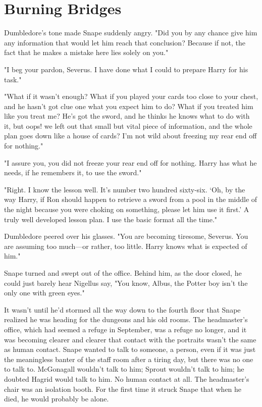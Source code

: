 
\chapter{Burning Bridges}

Dumbledore's tone made Snape suddenly angry. "Did you by any chance give him any information that would let him reach that conclusion? Because if not, the fact that he makes a mistake here lies solely on you."

"I beg your pardon, Severus. I have done what I could to prepare Harry for his task."

"What if it wasn't enough? What if you played your cards too close to your chest, and he hasn't got clue one what you expect him to do? What if you treated him like you treat me? He's got the sword, and he thinks he knows what to do with it, but oops! we left out that small but vital piece of information, and the whole plan goes down like a house of cards? I'm not wild about freezing my rear end off for nothing."

"I assure you, you did not freeze your rear end off for nothing. Harry has what he needs, if he remembers it, to use the sword."

"Right. I know the lesson well. It's number two hundred sixty-six. `Oh, by the way Harry, if Ron should happen to retrieve a sword from a pool in the middle of the night because you were choking on something, please let him use it first.' A truly well developed lesson plan. I use the basic format all the time."

Dumbledore peered over his glasses. "You are becoming tiresome, Severus. You are assuming too much—or rather, too little. Harry knows what is expected of him."

Snape turned and swept out of the office. Behind him, as the door closed, he could just barely hear Nigellus say, "You know, Albus, the Potter boy isn't the only one with green eyes."

It wasn't until he'd stormed all the way down to the fourth floor that Snape realized he was heading for the dungeons and his old rooms. The headmaster's office, which had seemed a refuge in September, was a refuge no longer, and it was becoming clearer and clearer that contact with the portraits wasn't the same as human contact. Snape wanted to talk to someone, a person, even if it was just the meaningless banter of the staff room after a tiring day, but there was no one to talk to. McGonagall wouldn't talk to him; Sprout wouldn't talk to him; he doubted Hagrid would talk to him. No human contact at all. The headmaster's chair was an isolation booth. For the first time it struck Snape that when he died, he would probably be alone.

